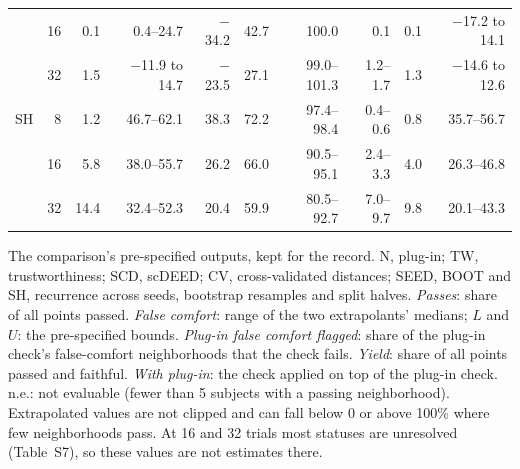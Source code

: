 \documentclass[11pt]{article}
\newcommand{\tablenote}[1]{\par\smallskip\noindent
  \begin{minipage}{\linewidth}\footnotesize\setlength{\parindent}{0pt}#1\end{minipage}}
\begin{document}
\begin{table}[!htb]
\begin{tabular}{lrrrrrrrrr}
 & 16 & 0.1 & 0.4--24.7 & $-$34.2 & 42.7 & 100.0 & 0.1 & 0.1 & $-$17.2 to 14.1 \\
 & 32 & 1.5 & $-$11.9 to 14.7 & $-$23.5 & 27.1 & 99.0--101.3 & 1.2--1.7 & 1.3 & $-$14.6 to 12.6 \\
\addlinespace
SH & 8 & 1.2 & 46.7--62.1 & 38.3 & 72.2 & 97.4--98.4 & 0.4--0.6 & 0.8 & 35.7--56.7 \\
 & 16 & 5.8 & 38.0--55.7 & 26.2 & 66.0 & 90.5--95.1 & 2.4--3.3 & 4.0 & 26.3--46.8 \\
 & 32 & 14.4 & 32.4--52.3 & 20.4 & 59.9 & 80.5--92.7 & 7.0--9.7 & 9.8 & 20.1--43.3 \\
\bottomrule
\end{tabular}
\tablenote{The comparison's pre-specified outputs, kept for the record.
N, plug-in; TW, trustworthiness; SCD, scDEED; CV, cross-validated distances; SEED, BOOT and SH, recurrence across seeds, bootstrap resamples and split halves.
\emph{Passes}: share of all points passed.
\emph{False comfort}: range of the two extrapolants' medians; $L$ and $U$: the pre-specified bounds.
\emph{Plug-in false comfort flagged}: share of the plug-in check's false-comfort neighborhoods that the check fails.
\emph{Yield}: share of all points passed and faithful.
\emph{With plug-in}: the check applied on top of the plug-in check.
n.e.: not evaluable (fewer than 5 subjects with a passing neighborhood).
Extrapolated values are not clipped and can fall below 0 or above 100\% where few neighborhoods pass.
At 16 and 32 trials most statuses are unresolved (Table~S7), so these values are not estimates there.}
\end{table}
\end{document}
